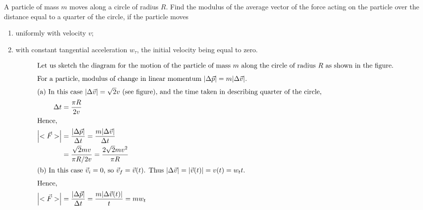 \item A particle of mass \( m \) moves along a circle of radius \( R \). Find the modulus of the average vector of the force acting on the particle over the distance equal to a quarter of the circle, if the particle moves
    \begin{enumerate}
        \item uniformly with velocity \( v \);
        \item with constant tangential acceleration \( w_{\tau} \), the initial velocity being equal to zero.
    \end{enumerate}
    \begin{center}
    \end{center}\begin{solution}
    \begin{center}
    \end{center}
    
    \begin{align*}
        \intertext{Let us sketch the diagram for the motion of the particle of mass $m$ along the circle of radius $R$ as shown in the figure.}
        \intertext{For a particle, modulus of change in linear momentum $\lvert \Delta\vec{p} \rvert = m \lvert \Delta\vec{v} \rvert$.}
        \intertext{(a) In this case $|\Delta \vec{v}| = \sqrt{2}v$ (see figure), and the time taken in describing quarter of the circle,}
        \Delta t &= \frac{\pi R}{2v}\\
        \intertext{Hence,}
        \left\lvert <\vec{F}> \right\rvert &= \frac{|\Delta \vec{p}|}{\Delta t} = \frac{m|\Delta \vec{v}|}{\Delta t}\\
        &= \frac{\sqrt{2}mv}{\pi R / 2v} = \frac{2 \sqrt{2} mv^2}{\pi R}\\
        \intertext{(b) In this case $\vec{v}_i = 0$, so $\vec{v}_f = \vec{v}(t)$. Thus $|\Delta \vec{v}| = |\vec{v}(t)| = v(t) = w_t t$.}
        \intertext{Hence,}
        \left\lvert <\vec{F}> \right\rvert &= \frac{|\Delta \vec{p}|}{\Delta t} = \frac{m|\Delta \vec{v}(t)|}{t} = mw_t
    \end{align*}
\end{solution}